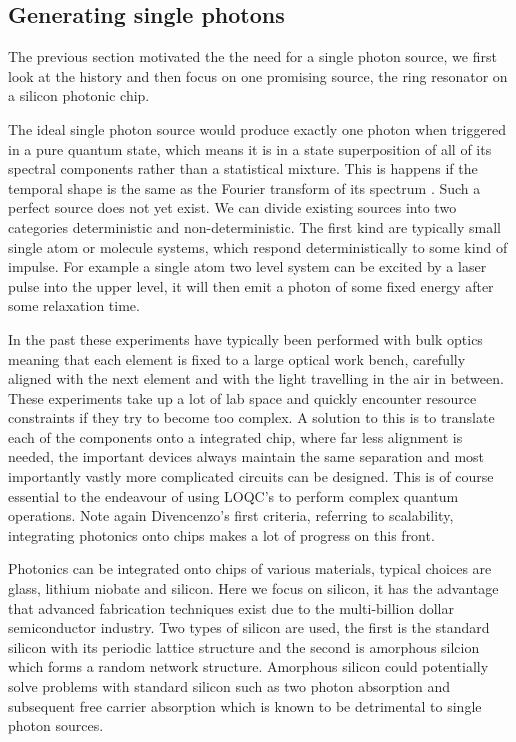 \subsection{Generating single photons}
The previous section motivated the the need for a single photon source, we first look at the history and then focus on one promising source, the ring resonator on a silicon photonic chip.

The ideal single photon source would produce exactly one photon when triggered in a pure quantum state, which means it is in a state superposition of all of its spectral components rather than a statistical mixture. This is happens if the temporal shape is the same as the Fourier transform of its spectrum \cite{uren_generation_2007}. Such a perfect source does not yet exist. We can divide existing sources into two categories deterministic and non-deterministic. The first kind are typically small single atom or molecule systems, which respond deterministically to some kind of impulse. For example a single atom two level system can be excited by a laser pulse into the upper level, it will then emit a photon of some fixed energy after some relaxation time. 


In the past these experiments have typically been performed with bulk optics meaning that each element is fixed to a large optical work bench, carefully aligned with the next element and with the light travelling in the air in between. These experiments take up a lot of lab space and quickly encounter resource constraints if they try to become too complex. A solution to this is to translate each of the components onto a integrated chip, where far less alignment is needed, the important devices always maintain the same separation and most importantly vastly more complicated circuits can be designed. This is of course essential to the endeavour of using LOQC's to perform complex quantum operations. Note again Divencenzo's first criteria, referring to scalability, integrating photonics onto chips makes a lot of progress on this front.

Photonics can be integrated onto chips of various materials, typical choices are glass, lithium niobate and silicon. Here we focus on silicon, it has the advantage that advanced fabrication techniques exist due to the multi-billion dollar semiconductor industry. Two types of silicon are used, the first is the standard silicon with its periodic lattice structure and the second is amorphous silcion which forms a random network structure. Amorphous silicon could potentially solve problems with standard silicon such as two photon absorption and subsequent free carrier absorption which is known to be detrimental to single photon sources.

